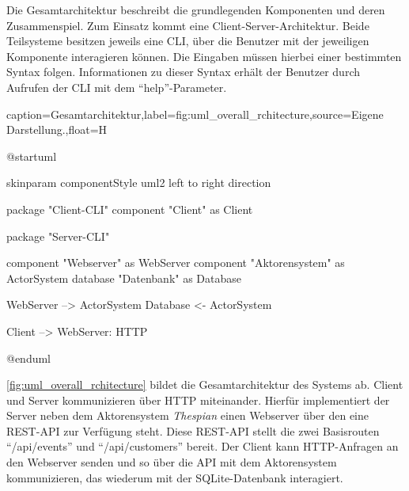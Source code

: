 Die Gesamtarchitektur beschreibt die grundlegenden Komponenten und deren Zusammenspiel.
Zum Einsatz kommt eine Client-Server-Architektur.
Beide Teilsysteme besitzen jeweils eine \ac{CLI}, über die Benutzer mit der jeweiligen Komponente interagieren können.
Die Eingaben müssen hierbei einer bestimmten Syntax folgen.
Informationen zu dieser Syntax erhält der Benutzer durch Aufrufen der \ac{CLI} mit dem \enquote{help}-Parameter.

\begin{dhbwfigure}{caption=Gesamtarchitektur,label=fig:uml_overall_rchitecture,source={Eigene Darstellung.},float=H}
    \begin{plantuml}
        @startuml

            skinparam componentStyle uml2
            left to right direction

            package "Client-CLI" {
                component "Client" as Client
            }

            package "Server-CLI" {
                component "Webserver" as WebServer
                component "Aktorensystem" as ActorSystem
                database "Datenbank" as Database

                WebServer --> ActorSystem
                Database <- ActorSystem
            }

            Client --> WebServer: HTTP

        @enduml
    \end{plantuml}
\end{dhbwfigure}\unskip

\autoref{fig:uml_overall_rchitecture} bildet die Gesamtarchitektur des Systems ab.
Client und Server kommunizieren über \ac{HTTP} miteinander.
Hierfür implementiert der Server neben dem Aktorensystem \textit{Thespian} einen Webserver über den eine \ac{REST}-\ac{API} zur Verfügung steht.
Diese \ac{REST}-\ac{API} stellt die zwei Basisrouten \enquote{/api/events} und \enquote{/api/customers} bereit.
Der Client kann \ac{HTTP}-Anfragen an den Webserver senden und so über die \ac{API} mit dem Aktorensystem kommunizieren, das wiederum mit der SQLite-Datenbank interagiert. 
